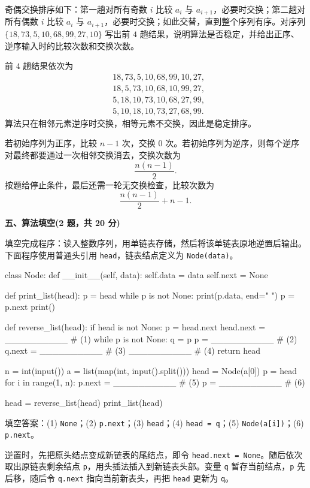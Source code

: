 \begin{question}[奇偶交换排序]
奇偶交换排序如下：第一趟对所有奇数 $i$ 比较 $a_i$ 与 $a_{i+1}$，必要时交换；第二趟对所有偶数 $i$ 比较 $a_i$ 与 $a_{i+1}$，必要时交换；如此交替，直到整个序列有序。对序列 $\{18,73,5,10,68,99,27,10\}$ 写出前 $4$ 趟结果，说明算法是否稳定，并给出正序、逆序输入时的比较次数和交换次数。
\begin{solution}
前 $4$ 趟结果依次为
\[
\begin{aligned}
&18,73,5,10,68,99,10,27,\\
&18,5,73,10,68,10,99,27,\\
&5,18,10,73,10,68,27,99,\\
&5,10,18,10,73,27,68,99.
\end{aligned}
\]
算法只在相邻元素逆序时交换，相等元素不交换，因此是稳定排序。

若初始序列为正序，比较 $n-1$ 次，交换 $0$ 次。若初始序列为逆序，则每个逆序对最终都要通过一次相邻交换消去，交换次数为
\[
\frac{n(n-1)}{2}.
\]
按题给停止条件，最后还需一轮无交换检查，比较次数为
\[
\frac{n(n-1)}{2}+n-1.
\]
\end{solution}
\end{question}

\textbf{五、算法填空(2 题，共 20 分)}

\begin{question}[单链表逆置]
填空完成程序：读入整数序列，用单链表存储，然后将该单链表原地逆置后输出。下面程序使用普通头引用 \texttt{head}，链表结点定义为 \texttt{Node(data)}。

\begin{pycode}
class Node:
    def __init__(self, data):
        self.data = data
        self.next = None


def print_list(head):
    p = head
    while p is not None:
        print(p.data, end=" ")
        p = p.next
    print()


def reverse_list(head):
    if head is not None:
        p = head.next
        head.next = __________                  # (1)
        while p is not None:
            q = p
            p = __________                      # (2)
            q.next = __________                 # (3)
            __________                          # (4)
    return head

n = int(input())
a = list(map(int, input().split()))
head = Node(a[0])
p = head
for i in range(1, n):
    p.next = __________                         # (5)
    p = __________                              # (6)

head = reverse_list(head)
print_list(head)
\end{pycode}
\begin{solution}
填空答案：(1) \texttt{None}；(2) \texttt{p.next}；(3) \texttt{head}；(4) \texttt{head = q}；(5) \texttt{Node(a[i])}；(6) \texttt{p.next}。

逆置时，先把原头结点变成新链表的尾结点，即令 \texttt{head.next = None}。随后依次取出原链表剩余结点 \texttt{p}，用头插法插入到新链表头部。变量 \texttt{q} 暂存当前结点，\texttt{p} 先后移，随后令 \texttt{q.next} 指向当前新表头，再把 \texttt{head} 更新为 \texttt{q}。
\end{solution}
\end{question}


